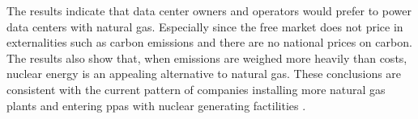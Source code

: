 The results indicate that data center owners and operators would prefer to power
data centers with natural gas. Especially since the free market does not price
in externalities such as carbon emissions and there are no national prices on
carbon. The results also show that, when emissions are weighed more heavily than
costs, nuclear energy is an appealing alternative to natural gas. These
conclusions are consistent with the current pattern of companies installing more
natural gas plants and entering \acp{ppa} with nuclear generating factilities
\cite{wittenberg_how_2025,swinhoe_meta_2024,constellation_energy_constellation_2025,
shaw_microsoft_2024}.

